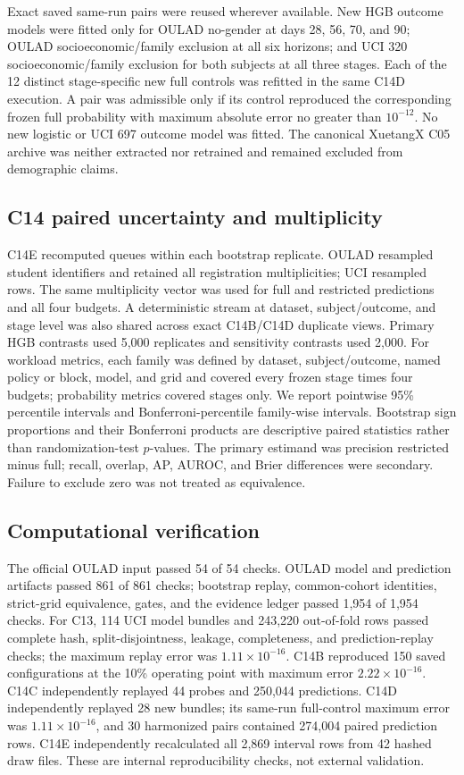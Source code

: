 \documentclass[11pt]{article}
\begin{document}
Exact saved same-run pairs were reused wherever available. New HGB outcome models were fitted only for OULAD no-gender at days 28, 56, 70, and 90; OULAD socioeconomic/family exclusion at all six horizons; and UCI 320 socioeconomic/family exclusion for both subjects at all three stages. Each of the 12 distinct stage-specific new full controls was refitted in the same C14D execution. A pair was admissible only if its control reproduced the corresponding frozen full probability with maximum absolute error no greater than $10^{-12}$. No new logistic or UCI 697 outcome model was fitted. The canonical XuetangX C05 archive was neither extracted nor retrained and remained excluded from demographic claims.

\subsection{C14 paired uncertainty and multiplicity}

C14E recomputed queues within each bootstrap replicate. OULAD resampled student identifiers and retained all registration multiplicities; UCI resampled rows. The same multiplicity vector was used for full and restricted predictions and all four budgets. A deterministic stream at dataset, subject/outcome, and stage level was also shared across exact C14B/C14D duplicate views. Primary HGB contrasts used 5,000 replicates and sensitivity contrasts used 2,000. For workload metrics, each family was defined by dataset, subject/outcome, named policy or block, model, and grid and covered every frozen stage times four budgets; probability metrics covered stages only. We report pointwise 95\% percentile intervals and Bonferroni-percentile family-wise intervals. Bootstrap sign proportions and their Bonferroni products are descriptive paired statistics rather than randomization-test $p$-values. The primary estimand was precision restricted minus full; recall, overlap, AP, AUROC, and Brier differences were secondary. Failure to exclude zero was not treated as equivalence.

\subsection{Computational verification}

The official OULAD input passed 54 of 54 checks. OULAD model and prediction artifacts passed 861 of 861 checks; bootstrap replay, common-cohort identities, strict-grid equivalence, gates, and the evidence ledger passed 1,954 of 1,954 checks. For C13, 114 UCI model bundles and 243,220 out-of-fold rows passed complete hash, split-disjointness, leakage, completeness, and prediction-replay checks; the maximum replay error was $1.11\times10^{-16}$. C14B reproduced 150 saved configurations at the 10\% operating point with maximum error $2.22\times10^{-16}$. C14C independently replayed 44 probes and 250,044 predictions. C14D independently replayed 28 new bundles; its same-run full-control maximum error was $1.11\times10^{-16}$, and 30 harmonized pairs contained 274,004 paired prediction rows. C14E independently recalculated all 2,869 interval rows from 42 hashed draw files. These are internal reproducibility checks, not external validation.
\end{document}

